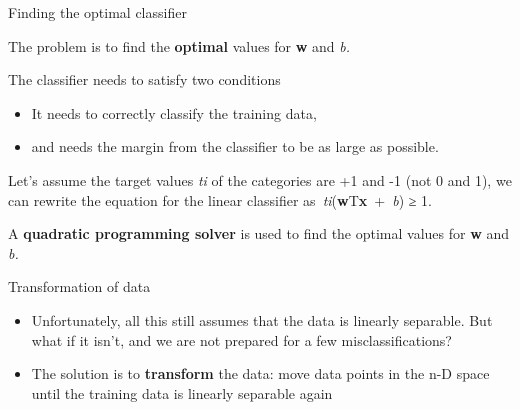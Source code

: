 \documentclass[compress]{beamer}
\begin{document}
\begin{frame}{Finding the optimal classifier}

The problem is to find the \textbf{optimal} values for \textbf{w} and
\emph{b.}

The classifier needs to satisfy two conditions

\begin{itemize}

\item
  It needs to correctly classify the training data,
\item
  and needs the margin from the classifier to be as large as possible.
\end{itemize}

Let's assume the target values \emph{ti} of the categories are +1 and -1
(not 0 and 1), we can rewrite the equation for the linear classifier
as~\emph{ti}(\textbf{w}T\textbf{x}~+~\emph{b}) ≥ 1.

A \textbf{quadratic programming solver} is used to find the optimal
values for \textbf{w} and \emph{b.}

\end{frame}

\begin{frame}{Transformation of data}

\begin{itemize}

\item
  Unfortunately, all this still assumes that the data is linearly
  separable. But what if it isn't, and we are not prepared for a few
  misclassifications?
\item
  The solution is to \textbf{transform} the data: move data points in
  the n-D space until the training data is linearly separable again
\end{itemize}

\end{frame}
\end{document}
